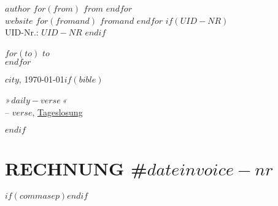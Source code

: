 \documentclass[$fontsize$, a4paper]{article}
\begin{document}
\small

\textsc{\textbf{\uppercase{$author$}}}
$for(from)$
\textbullet{} \textsc{$from$}
$endfor$ \\
$website$
$for(fromand)$
\textbullet{} {$fromand$}
$endfor$ $if(UID-NR)$ \\
  UID-Nr.: $UID-NR$ $endif$

\vspace{1em}

\normalsize \sffamily
$for(to)$
$to$\\
$endfor$

\vspace{2em}

\begin{flushright}
  \small
  $city$, \today $if(bible)$ \\[0.4em]
  \begin{minipage}{5cm}
    \begin{flushright}
    \scriptsize \emph{»\,$daily-verse$\,«} \\[-0.5em]
    \tiny -- {$verse$}, \href{https://www.bible.com/de/verse-of-the-day}{Tageslosung} \small 
    \end{flushright}
  \end{minipage} $endif$
\end{flushright}

\vspace{1em}

\section*{\textsc{RECHNUNG} \textsc{\#$date$$invoice-nr$}}
\footnotesize
{}
\setcounter{pos}{0}
$if(commasep)$\STsetdecimalsep{,}$endif$ %
\end{document}
